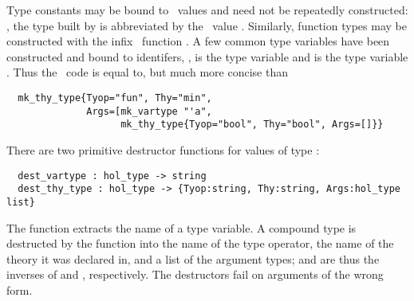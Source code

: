 Type constants may be
bound to \ML\ values and need not be repeatedly constructed: \eg, the type built by
 is abbreviated
by the \ML\ value . Similarly, function types may be constructed
with the infix \ML\ function \ml{-->}. A few common type variables
have been constructed and bound to \ML{} identifers, \eg, 
is the type variable  and  is the type variable
.  Thus the \ML\ code  is equal to, but much more concise than
%
\begin{hol}
\begin{verbatim}
  mk_thy_type{Tyop="fun", Thy="min",
              Args=[mk_vartype "'a",
                    mk_thy_type{Tyop="bool", Thy="bool", Args=[]}}
\end{verbatim}
\end{hol}


\noindent
There are two primitive destructor
%
%
functions for values of type :
\begin{holboxed}
\begin{verbatim}
  dest_vartype : hol_type -> string
  dest_thy_type : hol_type -> {Tyop:string, Thy:string, Args:hol_type list}
\end{verbatim}
\end{holboxed}

\noindent The function 
%
%
extracts the name of a type variable.  A compound type is destructed
by the function  into the name of the type
operator, the name of the theory it was declared in, and a list of the
argument types;  and  are thus
the inverses of  and , respectively.
The destructors fail on arguments of the wrong form.

